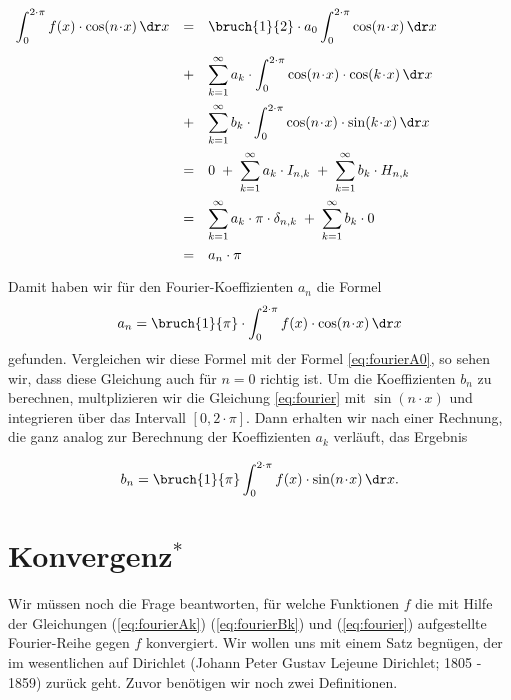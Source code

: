 $
\begin{array}[t]{lcl}
      \displaystyle \int_0^{2\cdot\pi}f(x)\cdot\cos(n\!\cdot\!x)\,\dr x 
& = & \displaystyle \bruch{1}{2}\cdot a_0  \int_0^{2\cdot\pi} \cos(n\!\cdot\!x)\,\dr x  \\[0.5cm]
& + & \displaystyle \sum\limits_{k=1}^\infty a_k\cdot \int_0^{2\cdot\pi} \cos(n\!\cdot\!x)\cdot\cos(k\!\cdot\!x) \,\dr x \\[0.5cm]
& + & \displaystyle \sum\limits_{k=1}^\infty b_k\cdot \int_0^{2\cdot\pi} \cos(n\!\cdot\!x)\cdot\sin(k\!\cdot\!x) \,\dr x \\[0.5cm]
& = & \displaystyle 0 \;+\; \sum\limits_{k=1}^\infty a_k\cdot I_{n,k} \;+\; \sum\limits_{k=1}^\infty b_k\cdot H_{n,k} \\[0.5cm]
& = & \displaystyle \sum\limits_{k=1}^\infty a_k\cdot \pi\cdot \delta_{n,k} \;+\; \sum\limits_{k=1}^\infty b_k\cdot 0 \\[0.5cm]
& = & \displaystyle a_n\cdot \pi \\[0.3cm]
\end{array}  
$
\\[0.1cm]
Damit haben wir f\"ur den Fourier-Koeffizienten $a_n$ die Formel 
\begin{equation}
  \label{eq:fourierAk}
 a_n = \bruch{1}{\pi} \cdot\int_0^{2\cdot\pi}f(x)\cdot\cos(n\!\cdot\!x)\,\dr x   
\end{equation}
gefunden.  Vergleichen wir diese Formel mit der Formel \ref{eq:fourierA0}, so sehen wir, dass diese Gleichung
auch f\"ur $n=0$ richtig ist.
Um die Koeffizienten $b_n$ zu berechnen, multplizieren wir die Gleichung
\ref{eq:fourier} mit $\sin(n\!\cdot\!x)$ und integrieren \"uber das Intervall $[0,2\!\cdot\!\pi]$. Dann  erhalten wir
nach einer Rechnung, die ganz analog zur Berechnung der Koeffizienten $a_k$ verl\"auft, das Ergebnis

\begin{equation}
  \label{eq:fourierBk}
 b_n = \bruch{1}{\pi} \int_0^{2\cdot\pi}f(x)\cdot\sin(n\!\cdot\!x)\,\dr x.   
\end{equation}

\section{Konvergenz$^*$}
Wir m\"ussen noch die Frage beantworten, f\"ur welche Funktionen $f$ die mit Hilfe der Gleichungen (\ref{eq:fourierAk})
(\ref{eq:fourierBk}) und (\ref{eq:fourier})  aufgestellte Fourier-Reihe gegen $f$ konvergiert. 
Wir wollen uns mit einem Satz begn\"ugen, der im wesentlichen auf Dirichlet 
(Johann Peter Gustav Lejeune Dirichlet; 1805 - 1859) zur\"uck geht.
Zuvor ben\"otigen wir noch zwei Definitionen.

